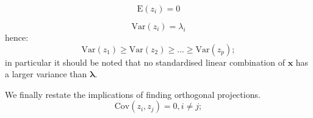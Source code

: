 
\begin{theorem}
\begin{equation} 
\label{pcszero}
\mbox{E}(z_{i}) = 0
\end{equation}

\begin{equation}
\mbox{Var}(z_{i}) = \lambda_{i}
\end{equation}
hence:
\begin{equation}
\mbox{Var}(z_{1}) \geq \mbox{Var}(z_{2}) \geq \ldots \geq \mbox{Var}(z_{p});
\end{equation}
in particular it should be noted that no standardised linear combination of $\boldsymbol{x}$ has a larger variance than $\boldsymbol{\lambda}$.

We finally restate the implications of finding orthogonal projections.
\begin{equation}
\mbox{Cov}(z_{i},z_{j}) = 0, i \neq j;
\end{equation}

\end{theorem}

